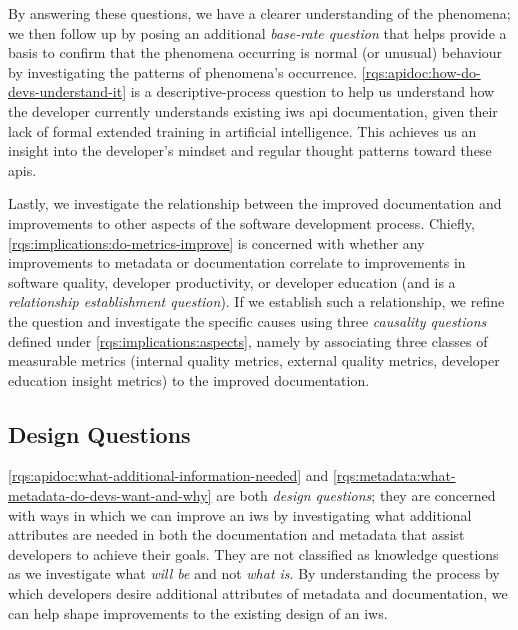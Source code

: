 By answering these questions, we have a clearer understanding of the phenomena; we then follow up by posing an additional \textit{base-rate question} that helps provide a basis to confirm that the phenomena occurring is normal (or unusual) behaviour by investigating the patterns of phenomena's occurrence. \ref{rqs:apidoc:how-do-devs-understand-it} is a descriptive-process question to help us understand how the developer currently understands existing \gls{iws} \gls{api} documentation, given their lack of formal extended training in artificial intelligence. This achieves us an insight into the developer's mindset and regular thought patterns toward these \glspl{api}.

Lastly, we investigate the relationship between the improved documentation and improvements to other aspects of the software development process. Chiefly, \ref{rqs:implications:do-metrics-improve} is concerned with whether any improvements to metadata or documentation correlate to improvements in software quality, developer productivity, or developer education (and is a \textit{relationship establishment question}). If we establish such a relationship, we refine the question and investigate the specific causes using three \textit{causality questions} defined under \ref{rqs:implications:aspects}, namely by associating three classes of measurable metrics (internal quality metrics, external quality metrics, developer education insight metrics) to the improved documentation.

\subsection{Design Questions}

\ref{rqs:apidoc:what-additional-information-needed} and \ref{rqs:metadata:what-metadata-do-devs-want-and-why} are both \textit{design questions}; they are concerned with ways in which we can improve an \gls{iws} by investigating what additional attributes are needed in both the documentation and metadata that assist developers to achieve their goals.  They are not classified as knowledge questions as we investigate what \textit{will be} and not \textit{what is}. By understanding the process by which developers desire additional attributes of metadata and documentation, we can help shape improvements to the existing design of an \gls{iws}. 